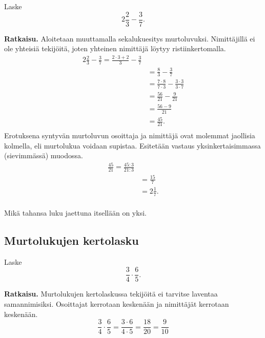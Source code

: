 \begin{esimerkki}
        Laske
        \[
        2\frac{2}{3} - \frac{3}{7}.
        \]
        
        \textbf{Ratkaisu.}
        Aloitetaan muuttamalla sekalukuesitys murtoluvuksi. Nimittäjillä ei ole yhteisiä tekijöitä, joten yhteinen nimittäjä 
        löytyy ristiinkertomalla.
        \begin{align*}
            2\frac{2}{3} - \frac{3}{7} = \frac{2\cdot3+2}{3} - \frac{3}{7} \\
            			&=\frac{8}{3} - \frac{3}{7}\\
            			&=\frac{7\cdot8}{7\cdot3} - \frac{3\cdot3}{3\cdot7}\\
            			&=\frac{56}{21} - \frac{9}{21}\\
            			&=\frac{56-9}{21}\\
            			&=\frac{45}{21}.\\
        \end{align*}
        Erotuksena syntyvän murtoluvun osoittaja ja nimittäjä ovat molemmat jaollisia kolmella, eli murtolukua voidaan supistaa. 
        Esitetään vastaus yksinkertaisimmassa (sievimmässä) muodossa.
        \begin{align*}
            \frac{45}{21} = \frac{45:3}{21:3}\\
		  &=\frac{15}{7}\\
		  &=2\frac{1}{7}.\\
        \end{align*}
    \end{esimerkki}

Mikä tahansa luku jaettuna itsellään on yksi.
    
\subsection*{Murtolukujen kertolasku}
    
\begin{esimerkki}
	Laske
	\[
        \frac{3}{4}\cdot \frac{6}{5}.
        \]
	
        \textbf{Ratkaisu.}
        Murtolukujen kertolaskussa tekijöitä ei tarvitse laventaa samannimisiksi. 
        Osoittajat kerrotaan keskenään ja nimittäjät kerrotaan keskenään. 
      \[
        \frac{3}{4}\cdot \frac{6}{5}= \frac{3\cdot 6}{4\cdot 5}= \frac{18}{20}=\frac{9}{10}
        \]
    \end{esimerkki}
    
